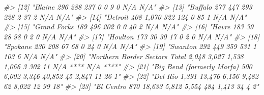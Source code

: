 \documentclass[
  12pt,
]{book}
\newenvironment{Shaded}{\begin{snugshade}}{\end{snugshade}}
\newcommand{\CommentTok}[1]{\textcolor[rgb]{0.37,0.37,0.37}{\textit{#1}}}
\begin{document}
\begin{Shaded}
\begin{Highlighting}[]
\CommentTok{\#> [12] "Blaine                                            296                288                      237                       0                0                9               0           N/A     N/A"   }
\CommentTok{\#> [13] "Buffalo                                           277                447                      293                     228               2                37               2           N/A     N/A"   }
\CommentTok{\#> [14] "Detroit                                           408               1,070                     322                     124               0                85               1           N/A     N/A"   }
\CommentTok{\#> [15] "Grand Forks                                       189                496                      202                       0                0               40               2           N/A     N/A"   }
\CommentTok{\#> [16] "Havre                                             183                 39                       28                      98                0                2               0           N/A     N/A"   }
\CommentTok{\#> [17] "Houlton                                           173                 30                       30                      17                0                2               0           N/A     N/A"   }
\CommentTok{\#> [18] "Spokane                                           230                208                       67                      68                0               24               0           N/A     N/A"   }
\CommentTok{\#> [19] "Swanton                                           292                449                      359                     531                1              103               6           N/A     N/A"   }
\CommentTok{\#> [20] "Northern Border Sectors Total                    2,048              3,027                    1,538                   1,066               3              302              11        N/A **** N/A ****"}
\CommentTok{\#> [21] "Big Bend (formerly Marfa)                         500               6,002                   3,346                   40,852              45             2,847             11            26      1"    }
\CommentTok{\#> [22] "Del Rio                                          1,391             13,476                    6,156                   9,482              62             8,022             12            99     18"    }
\CommentTok{\#> [23] "El Centro                                         870              18,633                    5,812                   5,554             484             1,413             34             4      2"    }

\end{Highlighting}
\end{Shaded}
\end{document}
